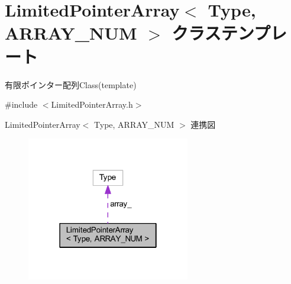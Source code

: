 \hypertarget{class_limited_pointer_array}{}\section{Limited\+Pointer\+Array$<$ Type, A\+R\+R\+A\+Y\+\_\+\+N\+UM $>$ クラステンプレート}
\label{class_limited_pointer_array}


有限ポインター配列\+Class(template)  




{\ttfamily \#include $<$Limited\+Pointer\+Array.\+h$>$}



Limited\+Pointer\+Array$<$ Type, A\+R\+R\+A\+Y\+\_\+\+N\+UM $>$ 連携図\nopagebreak
\begin{figure}[H]
\begin{center}
\leavevmode
\includegraphics[width=202pt]{class_limited_pointer_array__coll__graph}
\end{center}
\end{figure}
